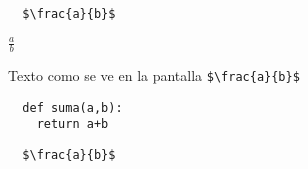 \documentclass{article}
\begin{document}
\begin{verbatim}
  $\frac{a}{b}$
\end{verbatim}
$\frac{a}{b}$

Texto como se ve en la pantalla \verb|$\frac{a}{b}$|


\begin{verbatim}
  def suma(a,b):
    return a+b
\end{verbatim}

\begin{verbatim}
  $\frac{a}{b}$
\end{verbatim}
\end{document}
